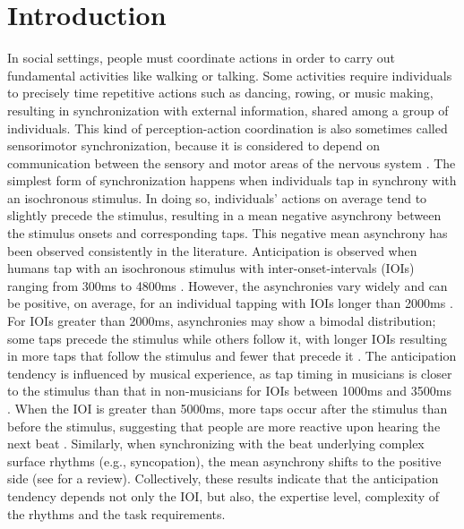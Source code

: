 \documentclass{report}
\begin{document}
\section{Introduction}
In social settings, people must coordinate actions in order to carry out fundamental activities like walking or talking. Some activities require individuals to precisely time repetitive actions such as dancing, rowing, or music making, resulting in synchronization with external information, shared among a group of individuals. This kind of perception-action coordination is also sometimes called sensorimotor synchronization, because it is considered to depend on communication between the sensory and motor areas of the nervous system \cite{oullier2005neural}. The simplest form of synchronization happens when individuals tap in synchrony with an isochronous stimulus. In doing so, individuals’ actions on average tend to slightly precede the stimulus, resulting in a mean negative asynchrony between the stimulus onsets and corresponding taps. This negative mean asynchrony has been observed consistently in the literature. Anticipation is observed when humans tap with an isochronous stimulus with inter-onset-intervals (IOIs) ranging from 300ms to 4800ms \cite{mates1994temporal}. However, the asynchronies vary widely and can be positive, on average, for an individual tapping with IOIs longer than 2000ms \cite{mates1994temporal}. For IOIs greater than 2000ms, asynchronies may show a bimodal distribution; some taps precede the stimulus while others follow it, with longer IOIs resulting in more taps that follow the stimulus and fewer that precede it \cite{baaaath2016estimating}. The anticipation tendency is influenced by musical experience, as tap timing in musicians is closer to the stimulus than that in non-musicians for IOIs between 1000ms and 3500ms \cite{repp2007tapping}. When the IOI is greater than 5000ms, more taps occur after the stimulus than before the stimulus, suggesting that people are more reactive upon hearing the next beat \cite{miyake2004two}. Similarly, when synchronizing with the beat underlying complex surface rhythms (e.g., syncopation), the mean asynchrony shifts to the positive side \cite{wohlschlager1999synchronization, snyder2001tapping, large2015neural} (see \cite{repp2005sensorimotor} for a review). Collectively, these results indicate that the anticipation tendency depends not only the IOI, but also, the expertise level, complexity of the rhythms and the task requirements.
\end{document}
